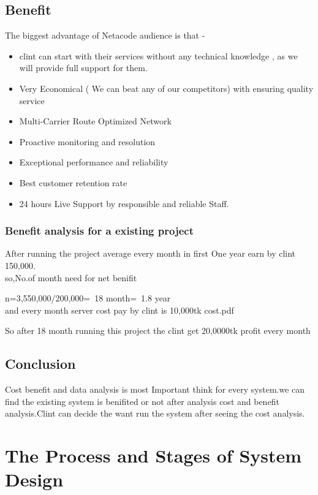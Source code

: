 \documentclass[a4paper,12pt]{report}
\begin{document}
\section{Benefit}
The biggest advantage of Netacode audience is that -
\begin{itemize}
	\item	clint can start with their services without any technical
	knowledge , as we will provide full support for them.
	\item Very Economical ( We can beat any of our competitors) with ensuring quality service
	\item Multi-Carrier Route Optimized Network
	\item Proactive monitoring and resolution
	\item Exceptional performance and reliability
	\item Best customer retention rate
	\item 24 hours Live Support by responsible and reliable Staff.
\end{itemize} 
\subsection{Benefit analysis for a existing project}
After running the project average every month in first One year  earn by clint 150,000.\\
so,No.of month  need for net benifit\begin{center}
	n=3,550,000/200,000=~18 month=~1.8 year \\
	and every month server cost pay  by clint is 10,000tk
	 {cost.pdf}
\end{center} 
So after 18 month running this project the clint get 20,0000tk profit every month
\section{Conclusion}
Cost benefit and data analysis is most Important think for every system.we can find the existing system is benifited or not after analysis cost and benefit analysis.Clint can decide the want run the system after seeing the cost analysis.








\chapter{The Process and Stages of System Design}	
\end{document}
